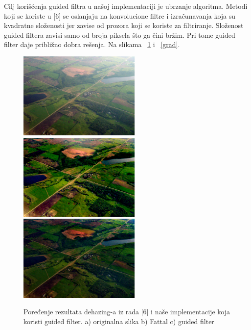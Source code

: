 \documentclass[a4paper,12pt,titlepage]{article}
\begin{document}
Cilj korišćenja guided filtra u našoj implementaciji je ubrzanje algoritma. Metodi koji se koriste u [6] se oslanjaju na konvolucione filtre i izračunavanja koja su kvadratne složenosti jer zavise od prozora koji se koriste za filtriranje. Složenost guided filtera zavisi samo od broja piksela što ga čini bržim. Pri tome guided filter daje približno dobra rešenja. Na slikama ~\ref{aerial} i ~\ref{grad}. 

\begin{figure}[ht!]
\centering
\includegraphics[width=60mm]{img/aerial.png}
\includegraphics[width=60mm]{img/aerialFattal.png}
\includegraphics[width=60mm]{img/aerialDe.png}
\caption{Poređenje rezultata dehazing-a iz rada [6] i naše implementacije koja koristi guided filter. a) originalna slika b) Fattal c) guided filter}
\label{aerial}
\end{figure} 
\end{document}
